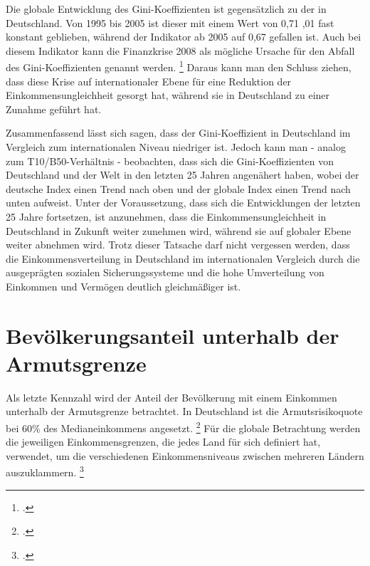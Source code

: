 Die globale Entwicklung des Gini-Koeffizienten ist gegensätzlich zu der in Deutschland. Von 1995 bis 2005 ist dieser mit einem Wert von 0,71 ,01 fast konstant geblieben, während der Indikator ab 2005 auf 0,67 gefallen ist. Auch bei diesem Indikator kann die Finanzkrise 2008 als mögliche Ursache für den Abfall des Gini-Koeffizienten genannt werden. \footcite[Vgl. ][S. 55]{wir_2022} Daraus kann man den Schluss ziehen, dass diese Krise auf internationaler Ebene für eine Reduktion der Einkommensungleichheit gesorgt hat, während sie in Deutschland zu einer Zunahme geführt hat.

Zusammenfassend lässt sich sagen, dass der Gini-Koeffizient in Deutschland im Vergleich zum internationalen Niveau niedriger ist. Jedoch kann man - analog zum T10/B50-Verhältnis - beobachten, dass sich die Gini-Koeffizienten von Deutschland und der Welt in den letzten 25 Jahren angenähert haben, wobei der deutsche Index einen Trend nach oben und der globale Index einen Trend nach unten aufweist. Unter der Voraussetzung, dass sich die Entwicklungen der letzten 25 Jahre fortsetzen, ist anzunehmen, dass die Einkommensungleichheit in Deutschland in Zukunft weiter zunehmen wird, während sie auf globaler Ebene weiter abnehmen wird. Trotz dieser Tatsache darf nicht vergessen werden, dass die Einkommensverteilung in Deutschland im internationalen Vergleich durch \zB die ausgeprägten sozialen Sicherungssysteme und die hohe Umverteilung von Einkommen und Vermögen deutlich gleichmä{\ss}iger ist.

\section{Bevölkerungsanteil unterhalb der Armutsgrenze}

Als letzte Kennzahl wird der Anteil der Bevölkerung mit einem Einkommen unterhalb der Armutsgrenze betrachtet. In Deutschland ist die Armutsrisikoquote bei 60\% des Medianeinkommens angesetzt. \footcite[Vgl.][]{bmas_arb_armutsrisikoquote_2023} Für die globale Betrachtung werden die jeweiligen Einkommensgrenzen, die jedes Land für sich definiert hat, verwendet, um die verschiedenen Einkommensniveaus zwischen mehreren Ländern auszuklammern. \footcite[Vgl.][]{wb_armutsquote_global_2022}

